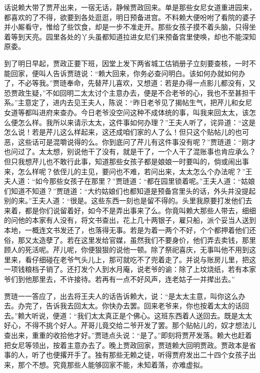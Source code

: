 


\begin{parag}
    话说赖大带了贾芹出来，一宿无话，静候贾政回来。单是那些女尼女道重进园来，都喜欢的了不得，欲要到各处逛逛，明日预备进宫。不料赖大便吩咐了看院的婆子并小厮看守，惟给了些饮食，却是一步不准走开。那些女孩子摸不着头脑，只得坐着等到天亮。园里各处的丫头虽都知道拉进女尼们来预备宫里使唤，却也不能深知原委。
\end{parag}


\begin{parag}
    到了明日早起，贾政正要下班，因堂上发下两省城工估销册子立刻要查核，一时不能回家，便叫人告诉贾琏说：“赖大回来，你务必查问明白。该如何办就如何办了，不必等我。”贾琏奉命，先替芹儿喜欢，又想道：若是办得一点影儿都没有，又恐贾政生疑，”不如回明二太太讨个主意办去，便是不合老爷的心，我也不至甚担干系。”主意定了，进内去见王夫人，陈说：“昨日老爷见了揭帖生气，把芹儿和女尼女道等都叫进府来查办。今日老爷没空问这种不成体统的事，叫我来回太太，该怎么便怎么样。我所以来请示太太，这件事如何办理？”王夫人听了，诧异道：“这是怎么说！若是芹儿这么样起来，这还成咱们家的人了么！但只这个贴帖儿的也可恶，这些话可是混嚼说得的么。你到底问了芹儿有这件事没有呢？”贾琏道：“刚才也问过了。太太想，别说他干了没有，就是干了，一个人干了混账事也肯应承么？但只我想芹儿也不敢行此事，知道那些女孩子都是娘娘一时要叫的，倘或闹出事来，怎么样呢？依侄儿的主见，要问也不难，若问出来，太太怎么个办法呢？”王夫人道：“如今那些女孩子在那里？”贾琏道：“都在园里锁着呢。”王夫人道：“姑娘们知道不知道？”贾琏道：“大约姑娘们也都知道是预备宫里头的话，外头并没提起别的来。”王夫人道：“很是。这些东西一刻也是留不得的。头里我原要打发他们去来着，都是你们说留着好，如今不是弄出事来了么。你竟叫赖大那些人带去，细细的问他的本家有人没有，将文书查出，花上几十两银子，雇只船，派个妥当人送到本地，一概连文书发还了，也落得无事。若是为着一两个不好，个个都押着他们还俗，那又太造孽了。若在这里发给官媒，虽然我们不要身价，他们弄去卖钱，那里顾人的死活呢。芹儿呢，你便狠狠的说他一顿。除了祭祀喜庆，无事叫他不用到这里来，看仔细碰在老爷气头儿上，那可就吃不了兜着走了。并说与账房儿里，把这一项钱粮档子销了。还打发个人到水月庵，说老爷的谕：除了上坟烧纸，若有本家爷们到他那里去，不许接待。若再有一点不好风声，连老姑子一并撵出去。”
\end{parag}


\begin{parag}
    贾琏一一答应了，出去将王夫人的话告诉赖大，说：“是太太主意，叫你这么办去。办完了，告诉我去回太太。你快办去罢。回来老爷来，你也按着太太的话回去。”赖大听说，便道：“我们太太真正是个佛心。这班东西着人送回去。既是太太好心，不得不挑个好人。芹哥儿竟交给二爷开发了罢。那个贴帖儿的，奴才想法儿查出来，重重的收拾他才好。”贾琏点头说：“是了。”即刻将贾芹发落。赖大也赶着把女尼等领出，按着主意办去了。晚上贾政回家，贾琏赖大回明贾政。贾政本是省事的人，听了也便撂开手了。独有那些无赖之徒，听得贾府发出二十四个女孩子出来，那个不想。究竟那些人能够回家不能，未知着落，亦难虚拟。
\end{parag}



